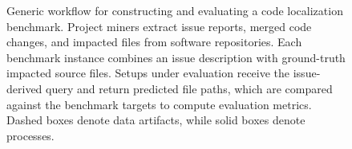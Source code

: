\begin{figure}[t]
\caption{Generic workflow for constructing and evaluating a code localization benchmark. Project miners extract issue reports, merged code changes, and impacted files from software repositories. Each benchmark instance combines an issue description with ground-truth impacted source files. Setups under evaluation receive the issue-derived query and return predicted file paths, which are compared against the benchmark targets to compute evaluation metrics. Dashed boxes denote data artifacts, while solid boxes denote processes.}
\label{fig:benchmark-workflow}
\end{figure}
